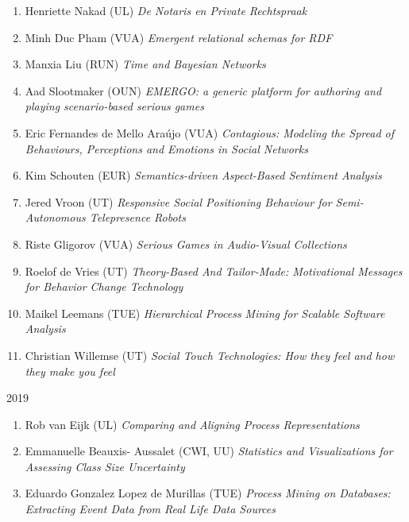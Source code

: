 \begin{multicols}{2}
\begin{scriptsize}
\begin{enumerate}[leftmargin=*,noitemsep,topsep=0pt,parsep=1pt,partopsep=0pt]
{}\item Henriette Nakad (UL) \textit{De Notaris en Private Rechtspraak 
}\item Minh Duc Pham (VUA) \textit{Emergent relational schemas for RDF 
}\item Manxia Liu (RUN) \textit{Time and Bayesian Networks 
}\item Aad Slootmaker (OUN) \textit{EMERGO: a generic platform for authoring and playing scenario-based serious games
}\item Eric Fernandes de Mello Araújo (VUA) \textit{Contagious: Modeling the Spread of Behaviours, Perceptions and Emotions in Social Networks
}\item Kim Schouten (EUR) \textit{Semantics-driven Aspect-Based Sentiment Analysis
}\item Jered Vroon (UT) \textit{Responsive Social Positioning Behaviour for Semi-Autonomous Telepresence Robots
}\item Riste Gligorov (VUA) \textit{Serious Games in Audio-Visual Collections
}\item Roelof de Vries (UT) \textit{Theory-Based And Tailor-Made: Motivational Messages for Behavior Change Technology 
}\item Maikel Leemans (TUE) \textit{Hierarchical Process Mining for Scalable Software Analysis}
\item Christian Willemse (UT) \textit{Social Touch Technologies: How they feel and how they make you feel}
\end{enumerate}	


\vspace{0.2cm}
2019
\vspace{0.2cm}
\begin{enumerate}[leftmargin=*,noitemsep,topsep=0pt,parsep=1pt,partopsep=0pt]
\renewcommand{\labelenumi}{2019-\arabic{enumi}}
\item Rob van Eijk (UL)	\textit{Comparing and Aligning Process Representations}
\item Emmanuelle Beauxis- Aussalet (CWI, UU) \textit{Statistics and Visualizations for Assessing Class Size Uncertainty}
\item Eduardo Gonzalez Lopez de Murillas (TUE) \textit{Process Mining on Databases: Extracting Event Data from Real Life Data Sources}
\end{enumerate}


\end{scriptsize}
\end{multicols}
\restoregeometry